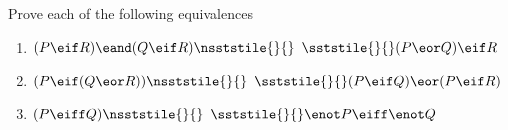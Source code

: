 \begin{enumerate}[label=(\arabic*)]
%
%
%




\end{enumerate}

\noindent\problempart
Prove each of the following equivalences
\begin{enumerate}[label=(\arabic*)]

\item $(P \eif R) \eand (Q \eif R) \nsststile{}{} \hspace{.5em} \sststile{}{}(P \eor Q) \eif R $ %
\item $(P \eif (Q \eor R)) \nsststile{}{} \hspace{.5em} \sststile{}{} (P \eif Q) \eor (P \eif R)$ %
\item $(P \eiff Q)  \nsststile{}{} \hspace{.5em} \sststile{}{} \enot P \eiff \enot Q		$ %
\end{enumerate}


